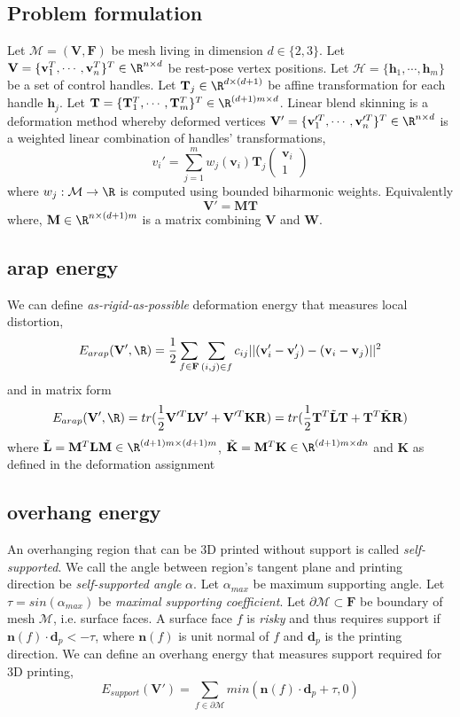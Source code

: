\documentclass[12pt]{article}
\newcommand{\calM}{\mathcal{M}}
\newcommand{\calH}{\mathcal{H}}
\newcommand{\bL}{\mathbf{L}}
\newcommand{\bV}{\mathbf{V}}
\newcommand{\bF}{\mathbf{F}}
\newcommand{\bR}{\mathbf{R}}
\newcommand{\bW}{\mathbf{W}}
\newcommand{\bM}{\mathbf{M}}
\newcommand{\bT}{\mathbf{T}}
\newcommand{\bv}{\mathbf{v}}
\newcommand{\bh}{\mathbf{h}}
\newcommand{\bK}{\mathbf{K}}
\newcommand{\bn}{\mathbf{n}}
\newcommand{\bd}{\mathbf{d}}
\begin{document}
\subsection*{Problem formulation}

Let $\calM = (\bV, \bF)$ be mesh living in dimension $d\in \{2,3\}$. Let $\bV = \{\bv_1^T, \cdots, \bv_n^T\}^T \in \R^{n \times d}$ be rest-pose vertex positions. Let $\calH = \{ \bh_1, \cdots, \bh_m \}$ be a set of control handles. Let $\bT_j \in \R^{d \times (d+1)}$ be affine transformation for each handle $\bh_j$. Let $\bT = \{ \bT_1^T, \cdots, \bT_m^T \}^T \in \R^{(d+1)m \times d}$. Linear blend skinning is a deformation method whereby deformed vertices $\bV' = \{ \bv_1'^T, \cdots, \bv_n'^T \}^T \in \R^{n\times d}$ is a weighted linear combination of handles' transformations,
\[
    v_i' = \sum_{j=1}^m w_j(\bv_i) \bT_j 
    \begin{pmatrix} 
    \bv_i \\
    1
    \end{pmatrix} 
\]
where $w_j: \calM \rightarrow \R$ is computed using bounded biharmonic weights. Equivalently
\[
    \bV' = \bM \bT
\]
where,  $\bM \in \R^{n \times (d+1)m}$ is a matrix combining $\bV$ and $\bW$. 

\subsection*{arap energy}

We can define \textit{as-rigid-as-possible} deformation energy that measures local distortion,
\[
    E_{arap}(\bV', \R) = \frac{1}{2} \sum_{f\in \bF} \sum_{(i,j)\in f} c_{ij} || (\bv_i' - \bv_j') - (\bv_i - \bv_j) ||^2
\]
and in matrix form
\[
    E_{arap}(\bV', \R) 
    = tr(\frac{1}{2}\bV'^T \bL \bV' + \bV'^T \bK \bR )
    = tr(\frac{1}{2}\bT^T \tilde{\bL} \bT + \bT^T \tilde{\bK} \bR)
\]
where $\tilde{\bL} = \bM^T \bL \bM \in \R^{(d+1)m \times (d+1)m}$, $\tilde{\bK} = \bM^T \bK \in \R^{(d+1)m \times dn}$ and $\bK$ as defined in the deformation assignment

\subsection*{overhang energy}

An overhanging region that can be 3D printed without support is called \textit{self-supported}. We call the angle between region's tangent plane and printing direction be \textit{self-supported angle} $\alpha$. Let $\alpha_{max}$ be maximum supporting angle. Let $\tau = sin(\alpha_{max})$ be \textit{maximal supporting coefficient}. Let $\partial \calM \subset \bF$ be boundary of mesh $\calM$, i.e. surface faces. A surface face $f$ is \textit{risky} and thus requires support if $\bn(f) \cdot \bd_{p} < -\tau$, where $\bn(f)$ is unit normal of $f$ and $\bd_{p}$ is the printing direction. We can define an overhang energy that measures support required for 3D printing,
\[
    E_{support}(\bV') = \sum_{f\in \partial \calM} min(\bn(f) \cdot \bd_{p} + \tau, 0)
\]
\end{document}

